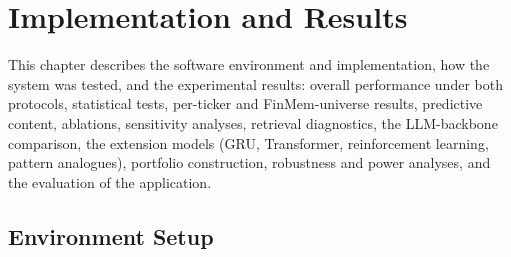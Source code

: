 \chapter{Implementation and Results}
\label{ch:impl}

This chapter describes the software environment and implementation, how the system was tested, and the experimental results: overall performance under both protocols, statistical tests, per-ticker and FinMem-universe results, predictive content, ablations, sensitivity analyses, retrieval diagnostics, the LLM-backbone comparison, the extension models (GRU, Transformer, reinforcement learning, pattern analogues), portfolio construction, robustness and power analyses, and the evaluation of the application.

\section{Environment Setup}
